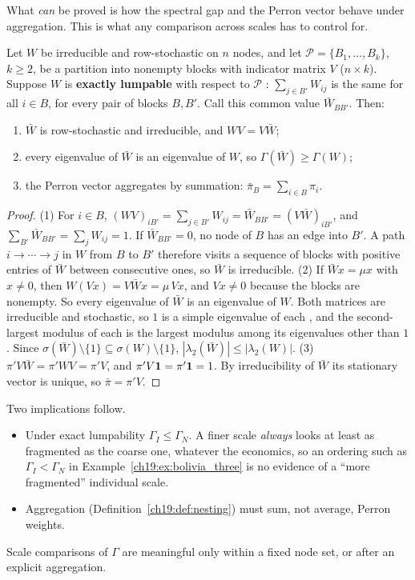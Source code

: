 \documentclass[../structural_economics_book.tex]{subfiles}
\begin{document}
What \emph{can} be proved is how the spectral gap and the Perron vector behave under aggregation. This is what any comparison across scales has to control for.

\begin{proposition}\label{ch19:prop:lumpability}
Let $W$ be irreducible and row-stochastic on $n$ nodes, and let $\mathcal{P} = \{B_1, \ldots, B_k\}$, $k \ge 2$, be a partition into nonempty blocks with indicator matrix $V$ ($n \times k$). Suppose $W$ is \textbf{exactly lumpable} with respect to $\mathcal{P}$ \citep{kemeny1960finite}: $\sum_{j \in B'} W_{ij}$ is the same for all $i \in B$, for every pair of blocks $B, B'$. Call this common value $\bar W_{BB'}$. Then:
\begin{enumerate}
\item $\bar W$ is row-stochastic and irreducible, and $WV = V\bar W$;
\item every eigenvalue of $\bar W$ is an eigenvalue of $W$, so $\Gamma(\bar W) \ge \Gamma(W)$;
\item the Perron vector aggregates by summation: $\bar\pi_B = \sum_{i \in B} \pi_i$.
\end{enumerate}
\end{proposition}

\begin{proof}
(1) For $i \in B$, $(WV)_{iB'} = \sum_{j\in B'}W_{ij} = \bar W_{BB'} = (V\bar W)_{iB'}$, and $\sum_{B'}\bar W_{BB'} = \sum_j W_{ij} = 1$. If $\bar W_{BB'} = 0$, no node of $B$ has an edge into $B'$. A path $i \to \cdots \to j$ in $W$ from $B$ to $B'$ therefore visits a sequence of blocks with positive entries of $\bar W$ between consecutive ones, so $\bar W$ is irreducible. (2) If $\bar W x = \mu x$ with $x \ne 0$, then $W(Vx) = V\bar W x = \mu\, Vx$, and $Vx \ne 0$ because the blocks are nonempty. So every eigenvalue of $\bar W$ is an eigenvalue of $W$. Both matrices are irreducible and stochastic, so $1$ is a simple eigenvalue of each \citep[Thm.~1.5]{seneta2006nonnegative}, and the second-largest modulus of each is the largest modulus among its eigenvalues other than $1$. Since $\sigma(\bar W)\setminus\{1\} \subseteq \sigma(W)\setminus\{1\}$, $|\lambda_2(\bar W)| \le |\lambda_2(W)|$. (3) $\pi' V \bar W = \pi' W V = \pi' V$, and $\pi'V \mathbf{1} = \pi'\mathbf{1} = 1$. By irreducibility of $\bar W$ its stationary vector is unique, so $\bar\pi = \pi'V$.
\end{proof}

Two implications follow.
\begin{itemize}
\item Under exact lumpability $\Gamma_I \le \Gamma_N$. A finer scale \emph{always} looks at least as fragmented as the coarse one, whatever the economics, so an ordering such as $\Gamma_I < \Gamma_N$ in Example~\ref{ch19:ex:bolivia_three} is no evidence of a ``more fragmented'' individual scale.
\item Aggregation (Definition~\ref{ch19:def:nesting}) must sum, not average, Perron weights.
\end{itemize}
Scale comparisons of $\Gamma$ are meaningful only within a fixed node set, or after an explicit aggregation.
\end{document}
